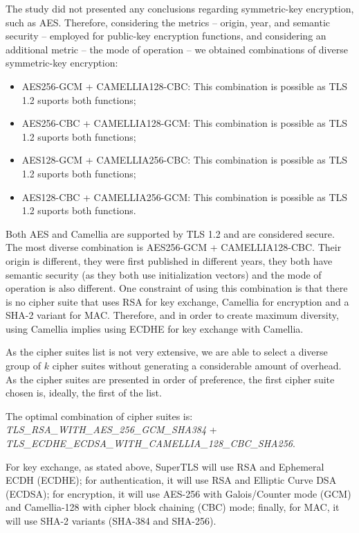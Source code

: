 \documentclass{sig-alternate-05-2015}
\begin{document}
The study did not presented any conclusions regarding symmetric-key encryption, such as AES. Therefore, considering the metrics -- origin, year, and semantic security -- employed for public-key encryption functions, and considering an additional metric -- the mode of operation -- we obtained combinations of diverse symmetric-key encryption:
\begin{itemize}
\item {AES256-GCM + CAMELLIA128-CBC: This combination is possible as TLS 1.2 suports both functions;}
\item {AES256-CBC + CAMELLIA128-GCM: This combination is possible as TLS 1.2 suports both functions;}
\item {AES128-GCM + CAMELLIA256-CBC: This combination is possible as TLS 1.2 suports both functions;}
\item {AES128-CBC + CAMELLIA256-GCM: This combination is possible as TLS 1.2 suports both functions.}
\end{itemize}

Both AES and Camellia are supported by TLS 1.2 and are considered secure. The most diverse combination is AES256-GCM + CAMELLIA128-CBC. Their origin is different, they were first published in different years, they both have semantic security (as they both use initialization vectors) and the mode of operation is also different. One constraint of using this combination is that there is no cipher suite that uses RSA for key exchange, Camellia for encryption and a SHA-2 variant for MAC. Therefore, and in order to create maximum diversity, using Camellia implies using ECDHE for key exchange with Camellia.

As the cipher suites list is not very extensive, we are able to select a diverse group of $k$ cipher suites without generating a considerable amount of overhead. As the cipher suites are presented in order of preference, the first cipher suite chosen is, ideally, the first of the list.

The optimal combination of cipher suites is:\\
\textit{TLS\_RSA\_WITH\_AES\_256\_GCM\_SHA384} + \\\textit{TLS\_ECDHE\_ECDSA\_WITH\_CAMELLIA\_128\_CBC\_SHA256}.

For key exchange, as stated above, SuperTLS will use RSA and Ephemeral ECDH (ECDHE); for authentication, it will use RSA and Elliptic Curve DSA (ECDSA); for encryption, it will use AES-256 with Galois/Counter mode (GCM) and Camellia-128 with cipher block chaining (CBC) mode; finally, for MAC, it will use SHA-2 variants (SHA-384 and SHA-256).
\end{document}
